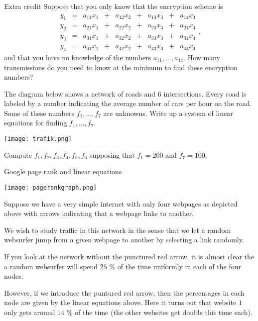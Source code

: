 \documentclass{article}
\begin{document}
\begin{hideinbutton}{Extra credit}
  Suppose that you only know that the encryption scheme is
\begin{equation*}
\begin{matrix}
  y_1 &= &a_{11} x_1 &+ & a_{12} x_2 &+ &a_{13} x_3 &+  &a_{14} x_4\\
  y_2 &= &a_{21} x_1 &+ &a_{22} x_2 &+ &a_{23} x_3 &+  &a_{24} x_4\\
  y_3 &= &a_{31} x_1 &+ &a_{32} x_2 &+ &a_{33} x_3 &+  &a_{34} x_4\\
  y_4 &= &a_{41} x_1 &+ &a_{42} x_2 &+ &a_{43} x_3 &+  &a_{44} x_4
\end{matrix},
\end{equation*}
and that you have no knowledge of the numbers $a_{11}, \dots, a_{44}$.
How many transmissions do you need to know at the minimum to find
these encryption numbers?
\end{hideinbutton}

\endshex


\beginshex
The diagram below shows a network of roads and $6$ intersections.
Every road is labeled by a number indicating the average number
of cars per hour on the road. Some of these numbers 
$f_1, \dots, f_7$ are unknowns. Write up a system of linear
equations for finding $f_1, \dots, f_7$. 

\texttt{[image: trafik.png]}


Compute
$f_1, f_2, f_3, f_4, f_5, f_6$ supposing that $f_1=200$ and $f_7=100$.
\endshex


\begin{hideinbutton}{Google page rank and linear equations}

  \texttt{[image: pagerankgraph.png]}


  Suppose we have a very simple internet with only four webpages
  as depicted above with arrows indicating that a webpage links to another.

  We wish to study traffic in this network in the sense that we let a random
  websurfer jump from a given webpage to another by selecting a link randomly.

  If you look at the network without the punctured red arrow, it is almost clear
  the a random websurfer will spend $25$ \% of the time uniformly in each of the
  four nodes.

  However, if we introduce the puntured red arrow, then the percentages in
  each node are given by the linear equations above. Here it turns out that
  website $1$ only gets around $14$ \% of the time (the other websites get double this time each).
\end{hideinbutton}
\end{document}
